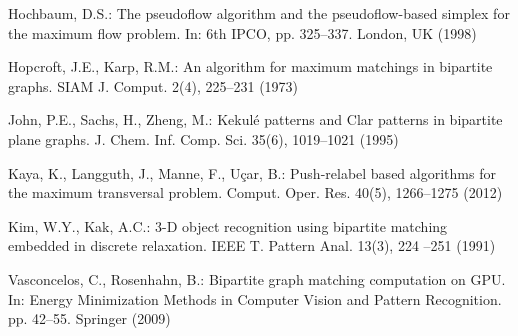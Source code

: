 \documentclass[11pt,a4paper]{article}
\begin{document}
\begin{thebibliography}{10}
Hochbaum, D.S.: The pseudoflow algorithm and the pseudoflow-based simplex for
  the maximum flow problem. In: 6th IPCO, pp. 325--337. London, UK (1998)

Hopcroft, J.E., Karp, R.M.: An  algorithm for maximum matchings in
  bipartite graphs. SIAM J. Comput.  2(4),  225--231 (1973)

John, P.E., Sachs, H., Zheng, M.: Kekul\'e patterns and {C}lar patterns in
  bipartite plane graphs. J. Chem. Inf. Comp. Sci.  35(6),  1019--1021 (1995)

Kaya, K., Langguth, J., Manne, F., U\c{c}ar, B.: Push-relabel based algorithms
  for the maximum transversal problem. Comput. Oper. Res.  40(5),  1266--1275
  (2012)

Kim, W.Y., Kak, A.C.: {3-D} object recognition using bipartite matching
  embedded in discrete relaxation. IEEE T. Pattern Anal.  13(3),  224 --251
  (1991)

Vasconcelos, C., Rosenhahn, B.: Bipartite graph matching computation on {GPU}.
  In: Energy Minimization Methods in Computer Vision and Pattern Recognition.
  pp. 42--55. Springer (2009)

\end{thebibliography}
\end{document}
